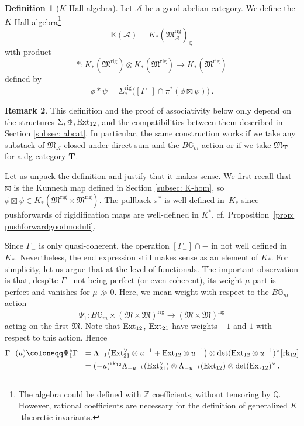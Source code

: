 \documentclass[12pt]{amsart}
\theoremstyle{definition}
\newtheorem{definition}{Definition}[section]
\newtheorem{remark}[definition]{Remark}
\newcommand{\BG}{{\mathbb{G}}}
\newcommand{\BK}{{\mathbb{K}}}
\newcommand{\BQ}{{\mathbb{Q}}}
\newcommand{\BZ}{{\mathbb{Z}}}
\newcommand{\CA}{{\mathcal A}}
\newcommand{\1}{\mathbf 1}
\newcommand{\bfT}{{\bf T}}
\newcommand{\FM}{{\mathfrak{M}}}
\newcommand{\Ext}{\mathcal{E}\text{xt}}
\newcommand{\rk}{\mathrm{rk}}
\newcommand{\rig}{\mathrm{rig}}
\renewcommand{\Ext}{\textup{Ext}}
\begin{document}
\begin{definition}[$K$-Hall algebra]\label{def: KHall}
Let $\CA$ be a good abelian category. We define the $K$-Hall algebra\footnote{The algebra could be defined with $\BZ$ coefficients, without tensoring by $\BQ$. However, rational coefficients are necessary for the definition of generalized $K$-theoretic invariants.} 
\[\BK(\CA)=K_\ast(\FM^\rig_\CA)_\BQ\]
with product 
\[\ast\colon K_\ast(\FM^\rig)\otimes K_\ast(\FM^\rig)\to K_\ast(\FM^\rig)\]
defined by
\[\phi\ast \psi=\Sigma_\ast^\rig\big([\Gamma_-]\cap \pi^\ast(\phi\boxtimes \psi)\big)\,.\]
\end{definition}


\begin{remark}\label{rmk: variationsHallproduct}
    This definition and the proof of associativity below only depend on the structures $\Sigma, \Phi, \Ext_{12}$, and the compatibilities between them described in Section \ref{subsec: abcat}. In particular, the same construction works if we take any substack of $\FM_\CA$ closed under direct sum and the $B\BG_m$ action or if we take $\FM_\bfT$ for a dg category $\bfT$.
\end{remark}

Let us unpack the definition and justify that it makes sense. We first recall that $\boxtimes$ is the Kunneth map defined in Section \ref{subsec: K-hom}, so $\phi\boxtimes \psi\in K_\ast(\FM^\rig\times \FM^\rig)$. The pullback $\pi^\ast$ is well-defined in~$K_\ast$ since pushforwards of rigidification maps are well-defined in $K^\ast$, cf. Proposition~\ref{prop: pushforwardgoodmoduli}. 

Since $\Gamma_-$ is only quasi-coherent, the operation $[\Gamma_-]\cap -$ in not well defined in $K_\ast$. Nevertheless, the end expression still makes sense as an element of $K_\ast$. For simplicity, let us argue that at the level of functionals. The important observation is that, despite $\Gamma_-$ not being perfect (or even coherent), its weight $\mu$ part is perfect and vanishes for $\mu\gg 0$. Here, we mean weight with respect to the $B\BG_m$ action
\[\Psi_1\colon B\BG_m\times (\FM\times \FM)^\rig\to (\FM\times \FM)^\rig\]
acting on the first $\FM$. Note that $\Ext_{12}$, $\Ext_{21}$ have weights $-1$ and $1$ with respect to this action. Hence
\begin{align*}
\Gamma_-(u)\coloneqq \Psi_1^\ast \Gamma_-&=\Lambda_{-1}\big(\Ext_{21}^\vee\otimes u^{-1}+\Ext_{12}\otimes u^{-1}\big)\otimes \det(\Ext_{12}\otimes u^{-1})^\vee[\rk_{12}]\\
&=(-u)^{\rk_{12}} \Lambda_{-u^{-1}}(\Ext_{21}^\vee)\otimes  \Lambda_{-u^{-1}}(\Ext_{12})\otimes \det(\Ext_{12})^\vee\,.
\end{align*}
\end{document}
